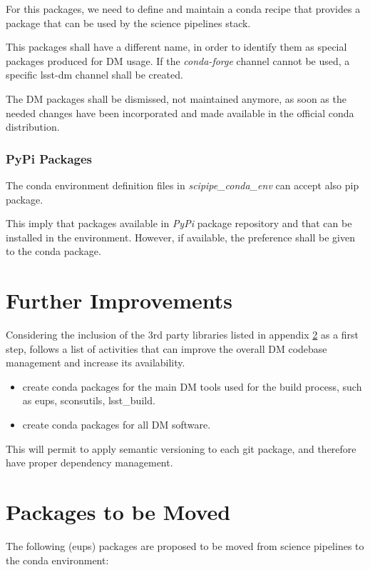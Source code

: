 For this packages, we need to define and maintain a conda recipe that provides a package that can be used by the science pipelines stack.

This packages shall have a different name, in order to identify them as special packages produced for DM usage.
If the \textit{conda-forge} channel cannot be used, a specific lsst-dm channel shall be created.

The DM packages shall be dismissed, not maintained anymore, as soon as the needed changes have been incorporated and made available in the official conda distribution.


\subsubsection{PyPi Packages} \label{sec:pypi}

The conda environment definition files in \textit{scipipe\_conda\_env} can accept also pip package. 

This imply that packages available in \textit{PyPi} package repository and that can be installed in the environment. 
However, if available, the preference shall be given to the conda package.


\newpage
\section{Further Improvements}

Considering the inclusion of the 3rd party libraries listed in appendix \ref{sec:tomove} as a first step, follows a list of activities that can improve the overall DM codebase management and increase its availability.

\begin{itemize}
\item create conda packages for the main DM tools used for the build process, such as eups, sconsutils, lsst\_build. 
\item create conda packages for all DM software.
\end{itemize}

This will permit to apply semantic versioning to each git package, and therefore have proper dependency management.


\newpage
\appendix
\section{Packages to be Moved} \label{sec:tomove}

The following (eups) packages are proposed to be moved from science pipelines to the conda environment:

